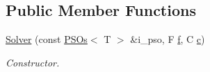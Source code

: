 \subsection*{Public Member Functions}
\begin{DoxyCompactItemize}
\item 
\hyperlink{classea_1_1_solver_3_01_p_s_os_00_01_t_00_01_f_00_01_c_01_4_a221b61b8df52b5d3d23a31e230d39f0d}{Solver} (const \hyperlink{structea_1_1_p_s_os}{P\+S\+Os}$<$ T $>$ \&i\+\_\+pso, F \hyperlink{classea_1_1_solver__base_ae0a893780c93dfe17c1d17301de6494f}{f}, C \hyperlink{classea_1_1_solver__base_a6914e89d30e7484f2b4af1783f0de8c3}{c})
\begin{DoxyCompactList}\small\item\em Constructor. \end{DoxyCompactList}\end{DoxyCompactItemize}

